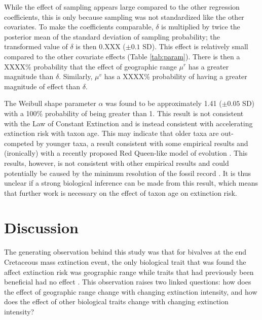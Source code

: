 \documentclass{article}
\begin{document}
While the effect of sampling appears large compared to the other regression coefficients, this is only because sampling was not standardized like the other covariates. To make the coefficients comparable, \(\delta\) is multiplied by twice the posterior mean of the standard deviation of sampling probability; the transformed value of \(\delta\) is then 0.XXX (\(\pm 0.1\) SD). This effect is relatively small compared to the other covariate effects (Table \ref{tab:param}). There is then a XXXX\% probability that the effect of geographic range \(\mu^{r}\) has a greater magnitude than \(\delta\). Similarly, \(\mu^{v}\) has a XXXX\% probability of having a greater magnitude of effect than \(\delta\). 





The Weibull shape parameter \(\alpha\) was found to be approximately 1.41 (\(\pm 0.05\) SD) with a 100\% probability of being greater than 1. This result is not consistent with the Law of Constant Extinction \citep{VanValen1973} and is instead consistent with accelerating extinction risk with taxon age. This may indicate that older taxa are out-competed by younger taxa, a result consistent with some empirical results \citep{Wagner2014b,Quental2013,Smits2015} and (ironically) with a recently proposed Red Queen-like model of evolution \citep{Rosindell2015a}. This results, however, is not consistent with other empirical results \citep{Finnegan2008,Crampton2016} and could potentially be caused by the minimum resolution of the fossil record \citep{Sepkoski1975}. It is thus unclear if a strong biological inference can be made from this result, which means that further work is necessary on the effect of taxon age on extinction risk.



\section{Discussion}

The generating observation behind this study was that for bivalves at the end Cretaceous mass extinction event, the only biological trait that was found the affect extinction risk was geographic range while traits that had previously been beneficial had no effect \citep{Jablonski1986}. This observation raises two linked questions: how does the effect of geographic range change with changing extinction intensity, and how does the effect of other biological traits change with changing extinction intensity?
\end{document}

